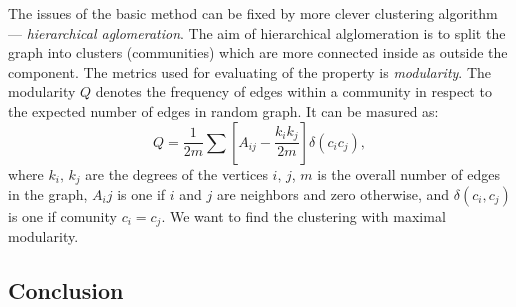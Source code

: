 The issues of the basic method can be fixed by more clever clustering algorithm --- \emph{hierarchical aglomeration}. The aim of hierarchical alglomeration is to split the graph into clusters (communities) which are more connected inside as outside the component. The metrics used for evaluating of the property is \emph{modularity}.
The modularity $Q$ denotes the frequency of edges within a community in respect to the expected number of edges in random graph. It can be masured as:
$$Q = \frac{1}{2m}\sum\left[A_{ij}-\frac{k_i k_j}{2m}\right] \delta(c_i c_j),$$
where $k_i,\, k_j$ are the degrees of the vertices $i,\,j$, $m$ is the overall number of edges in the graph, $A_ij$ is one if $i$ and $j$ are neighbors and zero otherwise, and $\delta(c_i, c_j)$ is one if comunity $c_i = c_j$.
We want to find the clustering with maximal modularity.



\subsection{Conclusion}




